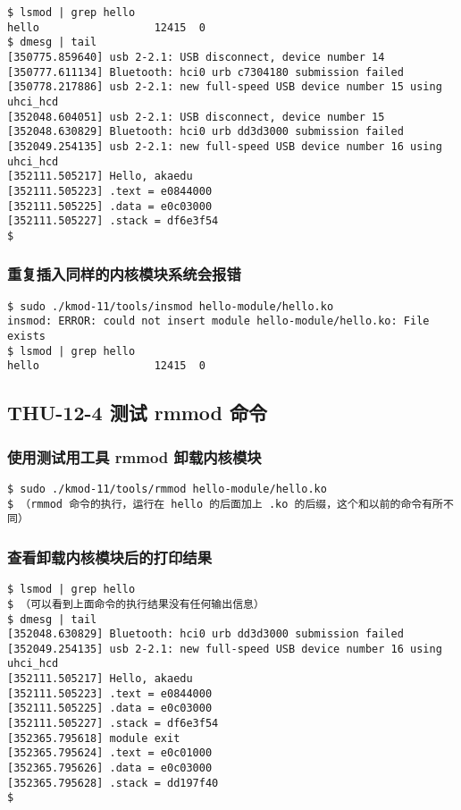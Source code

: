 \documentclass[11pt,a4paper]{article}
\begin{document}
{\begin{shaded}\begin{verbatim}
$ lsmod | grep hello
hello                  12415  0 
$ dmesg | tail
[350775.859640] usb 2-2.1: USB disconnect, device number 14
[350777.611134] Bluetooth: hci0 urb c7304180 submission failed
[350778.217886] usb 2-2.1: new full-speed USB device number 15 using uhci_hcd
[352048.604051] usb 2-2.1: USB disconnect, device number 15
[352048.630829] Bluetooth: hci0 urb dd3d3000 submission failed
[352049.254135] usb 2-2.1: new full-speed USB device number 16 using uhci_hcd
[352111.505217] Hello, akaedu
[352111.505223] .text = e0844000
[352111.505225] .data = e0c03000
[352111.505227] .stack = df6e3f54
$ 
\end{verbatim}\end{shaded}}
\subsubsection{重复插入同样的内核模块系统会报错}

{\begin{shaded}\begin{verbatim}
$ sudo ./kmod-11/tools/insmod hello-module/hello.ko 
insmod: ERROR: could not insert module hello-module/hello.ko: File exists
$ lsmod | grep hello
hello                  12415  0 
\end{verbatim}\end{shaded}}
\subsection{THU-12-4 测试 rmmod 命令}

\subsubsection{使用测试用工具 rmmod 卸载内核模块}

{\begin{shaded}\begin{verbatim}
$ sudo ./kmod-11/tools/rmmod hello-module/hello.ko
$ （rmmod 命令的执行，运行在 hello 的后面加上 .ko 的后缀，这个和以前的命令有所不同）
\end{verbatim}\end{shaded}}
\subsubsection{查看卸载内核模块后的打印结果}

{\begin{shaded}\begin{verbatim}
$ lsmod | grep hello
$ （可以看到上面命令的执行结果没有任何输出信息）
$ dmesg | tail
[352048.630829] Bluetooth: hci0 urb dd3d3000 submission failed
[352049.254135] usb 2-2.1: new full-speed USB device number 16 using uhci_hcd
[352111.505217] Hello, akaedu
[352111.505223] .text = e0844000
[352111.505225] .data = e0c03000
[352111.505227] .stack = df6e3f54
[352365.795618] module exit
[352365.795624] .text = e0c01000
[352365.795626] .data = e0c03000
[352365.795628] .stack = dd197f40
$ 
\end{verbatim}\end{shaded}}
\end{document}

